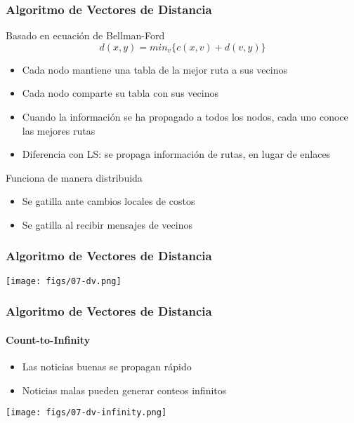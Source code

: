 \documentclass[letter]{beamer}
\begin{document}
\begin{frame}
  \frametitle{Algoritmo de Vectores de Distancia}

  Basado en ecuación de Bellman-Ford
  \[
    d(x,y) = min_v\{c(x,v) + d(v,y)\}
  \]
  \begin{itemize}
    \item Cada nodo mantiene una tabla de la mejor ruta a sus vecinos
    \item Cada nodo comparte su tabla con sus vecinos
    \item Cuando la información se ha propagado a todos los nodos, cada uno conoce las mejores rutas
    \item Diferencia con LS: se propaga información de rutas, en lugar de enlaces
  \end{itemize}
  Funciona de manera distribuida
  \begin{itemize}
    \item Se gatilla ante cambios locales de costos
    \item Se gatilla al recibir mensajes de vecinos
  \end{itemize}

\end{frame}
\begin{frame}
  \frametitle{Algoritmo de Vectores de Distancia}

  \begin{center}
    \texttt{[image: figs/07-dv.png]}
  \end{center}

  
\end{frame}
\begin{frame}
  \frametitle{Algoritmo de Vectores de Distancia}
  \framesubtitle{Count-to-Infinity}
  
  \begin{itemize}
    \item Las noticias buenas se propagan rápido
    \item Noticias malas pueden generar conteos infinitos
  \end{itemize}

  \begin{center}
    \texttt{[image: figs/07-dv-infinity.png]}
  \end{center}

\end{frame}
\end{document}
